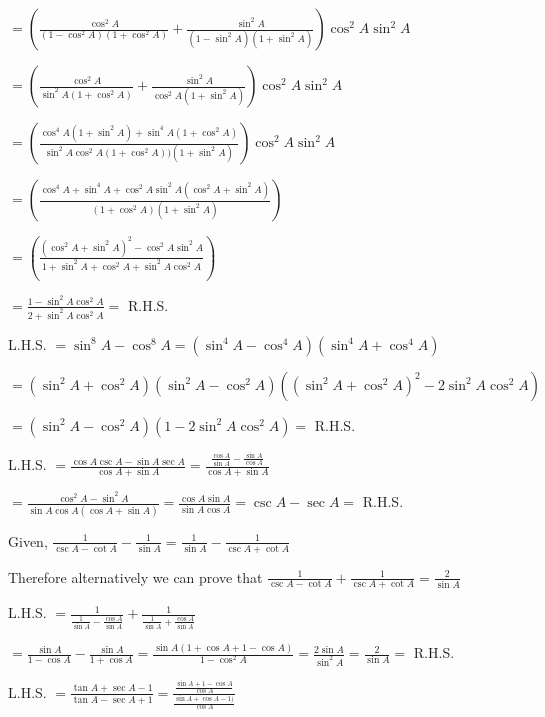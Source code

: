     $= \left(\frac{\cos^2A}{(1 - \cos^2A)(1 + \cos^2A)} + \frac{\sin^2A}{(1 - \sin^2A)(1 + \sin^2A)}\right)\cos^2A\sin^2A$

    $= \left(\frac{\cos^2A}{\sin^2A(1 + \cos^2A)} + \frac{\sin^2A}{\cos^2A(1 + \sin^2A)}\right)\cos^2A\sin^2A$

    $= \left(\frac{\cos^4A(1 + \sin^2A) + \sin^4A(1 + \cos^2A)}{\sin^2A\cos^2A(1 + \cos^2A))(1 +
    \sin^2A)}\right)\cos^2A\sin^2A$

    $= \left(\frac{\cos^4A + \sin^4A + \cos^2A\sin^2A(\cos^2A + \sin^2A)}{(1 +\cos^2A)(1 + \sin^2A)}\right)$

    $= \left(\frac{(\cos^2A + \sin^2A)^2 - \cos^2A\sin^2A}{1 + \sin^2A + \cos^2A + \sin^2A\cos^2A}\right)$

    $= \frac{1 - \sin^2A\cos^2A}{2 + \sin^2A\cos^2A} =$ R.H.S.

\item L.H.S. $= \sin^8A - \cos^8A = (\sin^4A - \cos^4A)(\sin^4A + \cos^4A)$

    $= (\sin^2A + \cos^2A)(\sin^2A - \cos^2A)((\sin^2A + \cos^2A)^2 - 2\sin^2A\cos^2A)$

    $= (\sin^2A - \cos^2A)(1 - 2\sin^2A\cos^2A) =$ R.H.S.

\item L.H.S. $= \frac{\cos A\csc A - \sin A\sec A}{\cos A + \sin A} = \frac{\frac{\cos A}{\sin A} - \frac{\sin A}{\cos
    A}}{\cos A + \sin A}$

    $= \frac{\cos^2A - \sin^2A}{\sin A\cos A(\cos A + \sin A)} = \frac{\cos A  \sin A}{\sin A\cos A} = \csc A - \sec A =$
    R.H.S.

\item Given, $\frac{1}{\csc A - \cot A} - \frac{1}{\sin A} = \frac{1}{\sin A} - \frac{1}{\csc A + \cot A}$

    Therefore alternatively we can prove that $\frac{1}{\csc A - \cot A} + \frac{1}{\csc A + \cot A} = \frac{2}{\sin A}$

    L.H.S. $= \frac{1}{\frac{1}{\sin A} - \frac{\cos A}{\sin A}} + \frac{1}{\frac{1}{\sin A} + \frac{\cos A}{\sin A}}$

    $= \frac{\sin A}{1 - \cos A} - \frac{\sin A}{1 + \cos A} = \frac{\sin A(1 + \cos A + 1 - \cos A)}{1 - \cos^2 A} =
    \frac{2\sin A}{\sin^2A} = \frac{2}{\sin A} =$ R.H.S.

\item L.H.S. $= \frac{\tan A + \sec A - 1}{\tan A - \sec A + 1} = \frac{\frac{\sin A + 1 - \cos A}{\cos A}}{\frac{\sin A + \cos
    A - 1)}{\cos A}}$

